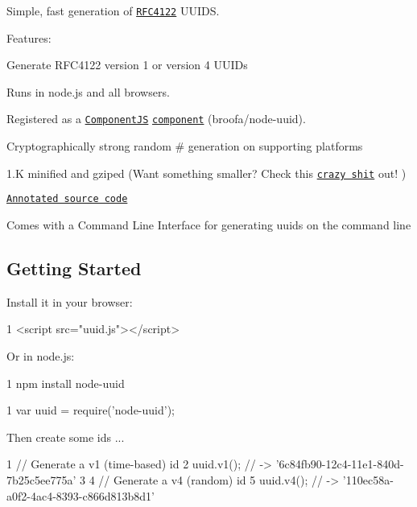Simple, fast generation of \href{http://www.ietf.org/rfc/rfc4122.txt}{\tt R\+F\+C4122} U\+U\+I\+D\+S.

Features\+:


\begin{DoxyItemize}
\item Generate R\+F\+C4122 version 1 or version 4 U\+U\+I\+Ds
\item Runs in node.\+js and all browsers.
\item Registered as a \href{https://github.com/component/component}{\tt Component\+J\+S} \href{https://github.com/component/component/wiki/Components}{\tt component} (\textquotesingle{}broofa/node-\/uuid\textquotesingle{}).
\item Cryptographically strong random \# generation on supporting platforms
\item 1.\+K minified and gzip\textquotesingle{}ed (Want something smaller? Check this \href{https://gist.github.com/982883}{\tt crazy shit} out! )
\item \href{http://broofa.github.com/node-uuid/docs/uuid.html}{\tt Annotated source code}
\item Comes with a Command Line Interface for generating uuids on the command line
\end{DoxyItemize}

\subsection*{Getting Started}

Install it in your browser\+:


\begin{DoxyCode}
1 <script src="uuid.js"></script>
\end{DoxyCode}


Or in node.\+js\+:


\begin{DoxyCode}
1 npm install node-uuid
\end{DoxyCode}



\begin{DoxyCode}
1 var uuid = require('node-uuid');
\end{DoxyCode}


Then create some ids ...


\begin{DoxyCode}
1 // Generate a v1 (time-based) id
2 uuid.v1(); // -> '6c84fb90-12c4-11e1-840d-7b25c5ee775a'
3 
4 // Generate a v4 (random) id
5 uuid.v4(); // -> '110ec58a-a0f2-4ac4-8393-c866d813b8d1'
\end{DoxyCode}


